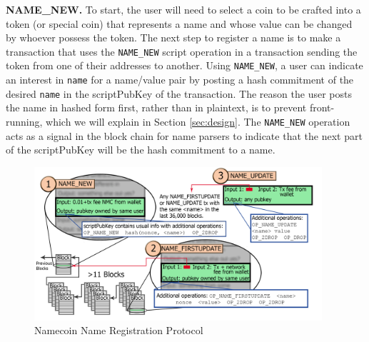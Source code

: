 {\bf NAME\_NEW.}
To start, the user will need to select a coin to be crafted into a token (or special coin) that represents a name and whose value can be changed by whoever possess the token. The next step to register a name is to make a transaction that uses the {\tt NAME\_NEW} script operation in a transaction sending the token from one of their addresses to another. Using {\tt NAME\_NEW}, a user can indicate an interest in {\tt name} for a name/value pair by posting a hash commitment of the desired {\tt name} in the scriptPubKey of the transaction. The reason the user posts the name in hashed form first, rather than in plaintext, is to prevent front-running, which we will explain in Section \ref{sec:design}.
The {\tt NAME\_NEW} operation acts as a signal in the block chain for name parsers to indicate that the next part of the scriptPubKey will be the hash commitment to a name. 

\begin{figure}
  \centering
  \includegraphics[width=0.95\textwidth]{figures/registration.png}
  \caption{Namecoin Name Registration Protocol}
  \label{fig:registration}
\end{figure}

